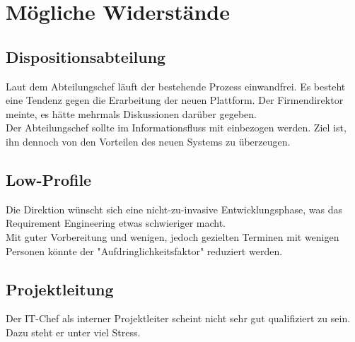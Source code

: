 \section{Mögliche Widerstände}
  \subsection{Dispositionsabteilung}
  Laut dem Abteilungschef läuft der bestehende Prozess einwandfrei. Es besteht eine Tendenz gegen die Erarbeitung der neuen Plattform.
  Der Firmendirektor meinte, es hätte mehrmals Diskussionen darüber gegeben.\\
  Der Abteilungschef sollte im Informationsfluss mit einbezogen werden. Ziel ist, ihn dennoch von den Vorteilen des neuen Systems zu überzeugen.
  \subsection{Low-Profile}
  Die Direktion wünscht sich eine nicht-zu-invasive Entwicklungsphase, was das Requirement Engineering etwas schwieriger macht.\\
  Mit guter Vorbereitung und wenigen, jedoch gezielten Terminen mit wenigen Personen könnte der "Aufdringlichkeitsfaktor" reduziert werden. 
  \subsection{Projektleitung}
  Der IT-Chef als interner Projektleiter scheint nicht sehr gut qualifiziert zu sein. Dazu steht er unter viel Stress.